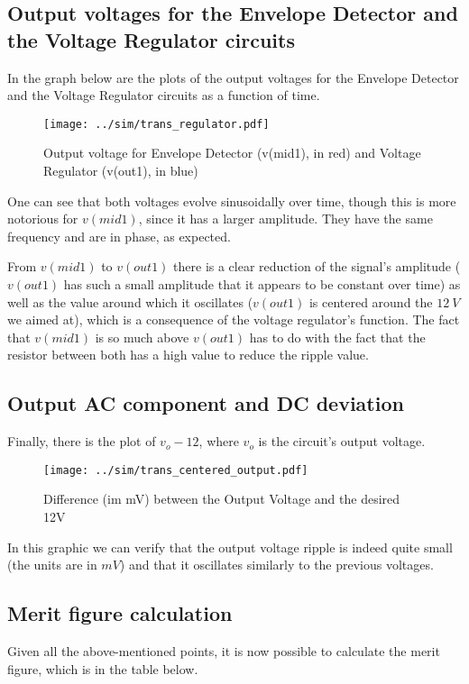 \subsection{Output voltages for the Envelope Detector and the Voltage Regulator circuits}
In the graph below are the plots of the output voltages for the Envelope Detector and the Voltage Regulator circuits as a function of time.

\begin{figure}[H] \centering
\texttt{[image: ../sim/trans\_regulator.pdf]}
\caption{Output voltage for Envelope Detector (v(mid1), in red) and Voltage Regulator (v(out1), in blue)}
\label{fig:phase_sim}
\end{figure}


One can see that both voltages evolve sinusoidally over time, though this is more notorious for $v(mid1)$, since it has a larger amplitude. They have the same frequency and are in phase, as expected.

From $v(mid1)$ to $v(out1)$ there is a clear reduction of the signal's amplitude ($v(out1)$ has such a small amplitude that it appears to be constant over time) as well as the value around which it oscillates ($v(out1)$ is centered around the $12 \ V$ we aimed at), which is a consequence of the voltage regulator's function.
The fact that $v(mid1)$ is so much above $v(out1)$ has to do with the fact that the resistor between both has a high value to reduce the ripple value.




\subsection{Output AC component and DC deviation}
Finally, there is the plot of $v_o - 12$, where $v_o$ is the circuit's output voltage.

\begin{figure}[H] \centering
\texttt{[image: ../sim/trans\_centered\_output.pdf]}
\caption{Difference (im mV) between the Output Voltage and the desired 12V}
\label{fig:phase_sim}
\end{figure}

In this graphic we can verify that the output voltage ripple is indeed quite small (the units are in $mV$) and that it oscillates similarly to the previous voltages.




\subsection{Merit figure calculation}
Given all the above-mentioned points, it is now possible to calculate the merit figure, which is in the table below.

